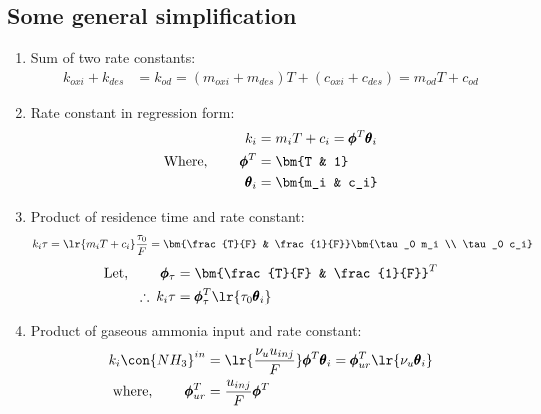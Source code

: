 \subsection{Some general simplification}
\begin{enumerate}
        \item Sum of two rate constants:
        \begin{align}
                k_{oxi} + k_{des} &= k_{od} = (m_{oxi} + m_{des}) T + (c_{oxi} + c_{des}) = m_{od} T + c_{od} \label{eqn::k_sum}
        \end{align}

        \item Rate constant in regression form:
        \begin{align}
                k_i &= m_i T + c_i = \pmb \phi^T \pmb \theta_i        \label{eqn::temp_k}\\
                \text{Where, } \qquad \pmb \phi^T &= \bm{T & 1}       \label{eqn::phi_i}\\
                                      \pmb \theta_i &= \bm{m_i & c_i} \label{eqn::theta_i}
        \end{align}

        \item Product of residence time and rate constant:
        \begin{align*}
        k_i \tau  = \lr{m_i T + c_i} \frac{\tau_0}{F} = \bm{\frac{T}{F} & \frac{1}{F}} \bm{\tau_0 m_i \\ \tau_0 c_i}
        \end{align*}
        \begin{align}
                \text{Let, } \qquad \pmb \phi_\tau &= \bm{\frac{T}{F} & \frac{1}{F}}^T  \label{eqn::phi_tau}\\
                \therefore \: k_i \tau &= \pmb \phi_\tau^T \lr{\tau_0 \pmb \theta_i}   \label{eqn::tau_ki}
        \end{align}

        \item Product of gaseous ammonia input and rate constant:
        \begin{align}
                k_{i} \con{NH_3}^{in} &= \lr{\frac{\nu_u u_{inj}}{F}} \pmb \phi^T \pmb \theta_i
                                       = \pmb \phi_{ur}^T \lr{\nu_u \pmb \theta_i}              \label{eqn::k_nh3}\\
                \text{where, } \qquad \pmb \phi_{ur}^T &= \frac{u_{inj}}{F} \pmb \phi^T         \label{eqn::phi_ur}
        \end{align}


\end{enumerate}
